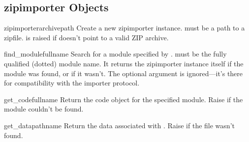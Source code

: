 \begin{seealso}


\end{seealso}


\subsection{zipimporter Objects \label{zipimporter-objects}}

\begin{classdesc}{zipimporter}{archivepath} 
  Create a new zipimporter instance.  must be a path to
  a zipfile.   is raised if 
  doesn't point to a valid ZIP archive.
\end{classdesc}

\begin{methoddesc}{find_module}{fullname}
  Search for a module specified by .  must be
  the fully qualified (dotted) module name. It returns the zipimporter
  instance itself if the module was found, or  if it wasn't.
  The optional  argument is ignored---it's there for 
  compatibility with the importer protocol.
\end{methoddesc}

\begin{methoddesc}{get_code}{fullname}
  Return the code object for the specified module. Raise
   if the module couldn't be found.
\end{methoddesc}

\begin{methoddesc}{get_data}{pathname}
  Return the data associated with . Raise 
  if the file wasn't found.
\end{methoddesc}

